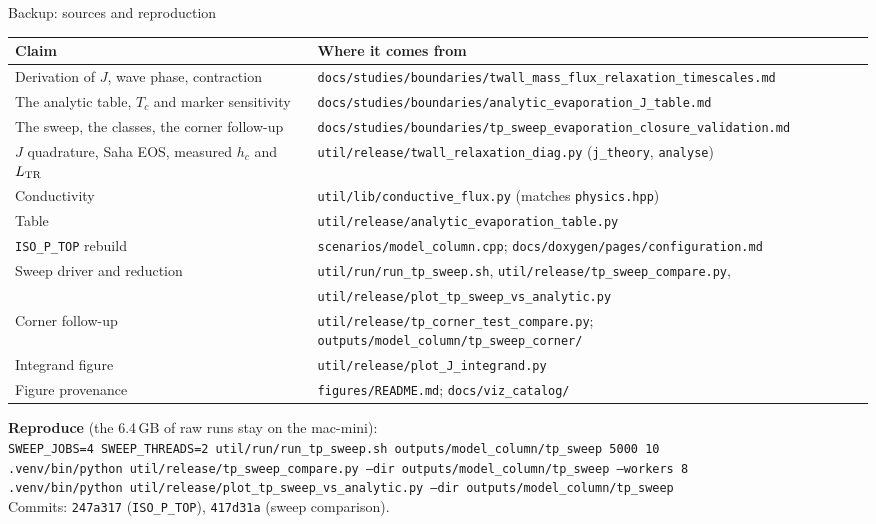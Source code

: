 \documentclass[aspectratio=169,10pt]{beamer}
\newcommand{\LTR}{L_{\rm TR}}
\begin{document}
\begin{frame}{Backup: sources and reproduction}
  \scriptsize
  \begin{tabular}{@{}ll@{}}
    \toprule
    Claim & Where it comes from \\
    \midrule
    Derivation of $J$, wave phase, contraction &
      \texttt{docs/studies/boundaries/twall\_mass\_flux\_relaxation\_timescales.md} \\
    The analytic table, $T_c$ and marker sensitivity &
      \texttt{docs/studies/boundaries/analytic\_evaporation\_J\_table.md} \\
    The sweep, the classes, the corner follow-up &
      \texttt{docs/studies/boundaries/tp\_sweep\_evaporation\_closure\_validation.md} \\
    $J$ quadrature, Saha EOS, measured $h_c$ and $\LTR$ &
      \texttt{util/release/twall\_relaxation\_diag.py} (\texttt{j\_theory}, \texttt{analyse}) \\
    Conductivity & \texttt{util/lib/conductive\_flux.py} (matches \texttt{physics.hpp}) \\
    Table & \texttt{util/release/analytic\_evaporation\_table.py} \\
    \texttt{ISO\_P\_TOP} rebuild & \texttt{scenarios/model\_column.cpp};
      \texttt{docs/doxygen/pages/configuration.md} \\
    Sweep driver and reduction & \texttt{util/run/run\_tp\_sweep.sh},
      \texttt{util/release/tp\_sweep\_compare.py}, \\
      & \texttt{util/release/plot\_tp\_sweep\_vs\_analytic.py} \\
    Corner follow-up & \texttt{util/release/tp\_corner\_test\_compare.py};
      \texttt{outputs/model\_column/tp\_sweep\_corner/} \\
    Integrand figure & \texttt{util/release/plot\_J\_integrand.py} \\
    Figure provenance & \texttt{figures/README.md}; \texttt{docs/viz\_catalog/} \\
    \bottomrule
  \end{tabular}
  \vspace{8pt}

  \textbf{Reproduce} (the 6.4\,GB of raw runs stay on the mac-mini):\\[2pt]
  \texttt{SWEEP\_JOBS=4 SWEEP\_THREADS=2 util/run/run\_tp\_sweep.sh
    outputs/model\_column/tp\_sweep 5000 10}\\
  \texttt{.venv/bin/python util/release/tp\_sweep\_compare.py --dir
    outputs/model\_column/tp\_sweep --workers 8}\\
  \texttt{.venv/bin/python util/release/plot\_tp\_sweep\_vs\_analytic.py --dir
    outputs/model\_column/tp\_sweep}\\[4pt]
  Commits: \texttt{247a317} (\texttt{ISO\_P\_TOP}), \texttt{417d31a} (sweep
  comparison).
\end{frame}
\end{document}
